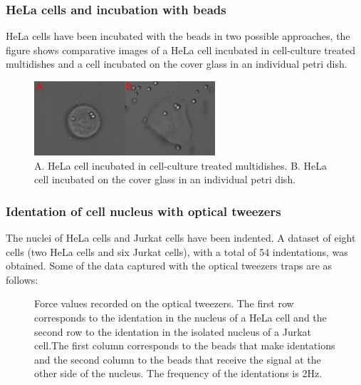 \documentclass[12pt, a4paper]{article} %
\begin{document}
\setlength{\parskip}{0mm}

\subsubsection{HeLa cells and incubation with beads}

HeLa cells have been incubated with the beads in two possible approaches, the figure shows comparative images of a HeLa cell incubated in cell-culture treated multidishes and a cell incubated on the cover glass in an individual petri dish.

\setlength{\parskip}{4mm}

\begin{figure}[htbp]
	\centering
	\includegraphics[width=0.60\textwidth]{figures/hela_cell_shape.png}
	\caption{A. HeLa cell incubated in cell-culture treated multidishes. B. HeLa cell incubated on the cover glass in an individual petri dish.}
	\label{fig:hela_cell_shape} 
\end{figure}

\setlength{\parskip}{0mm}

\subsubsection{Identation of cell nucleus with optical tweezers}

The nuclei of HeLa cells and Jurkat cells have been indented. A dataset of eight cells (two HeLa cells and six Jurkat cells), with a total of 54 indentations, was obtained. Some of the data captured with the optical tweezers traps are as follows:

\setlength{\parskip}{4mm}

\begin{figure}[htbp]
	\centering
	
	\caption{Force values recorded on the optical tweezers. The first row corresponds to the identation in the nucleus of a HeLa cell and the second row to the identation in the isolated nucleus of a Jurkat cell.The first column corresponds to the beads that make identations and the second column to the beads that receive the signal at the other side of the nucleus. The frequency of the identations is 2Hz.}
	\label{fig:raw_data_cells}
\end{figure}
\end{document}
